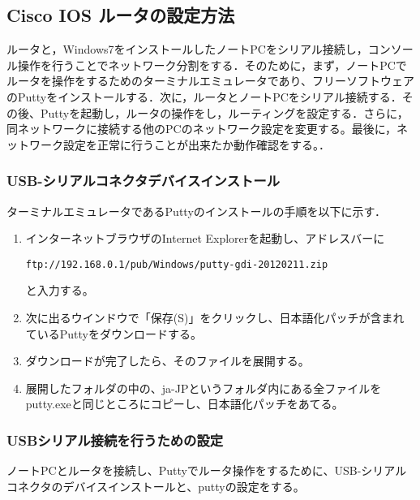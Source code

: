 \documentclass[a4j,titlepage]{jarticle}
\begin{document}
\subsection{Cisco IOS ルータの設定方法}
ルータと，Windows7をインストールしたノートPCをシリアル接続し，コンソール操作を行うことでネットワーク分割をする．そのために，まず，ノートPCでルータを操作をするためのターミナルエミュレータであり、フリーソフトウェアのPuttyをインストールする．次に，ルータとノートPCをシリアル接続する．その後、Puttyを起動し，ルータの操作をし，ルーティングを設定する．さらに，同ネットワークに接続する他のPCのネットワーク設定を変更する。最後に，ネットワーク設定を正常に行うことが出来たか動作確認をする。．

\subsubsection{USB-シリアルコネクタデバイスインストール}
ターミナルエミュレータであるPuttyのインストールの手順を以下に示す．

\begin{enumerate}
  
\item インターネットブラウザのInternet Explorerを起動し、アドレスバーに
\begin{screen}
\begin{center}
\begin{verbatim}
ftp://192.168.0.1/pub/Windows/putty-gdi-20120211.zip
\end{verbatim}
\end{center}
\end{screen}
と入力する。

\item 次に出るウインドウで「保存(S)」をクリックし、日本語化パッチが含まれているPuttyをダウンロードする。

\item ダウンロードが完了したら、そのファイルを展開する。

\item 展開したフォルダの中の、ja-JPというフォルダ内にある全ファイルをputty.exeと同じところにコピーし、日本語化パッチをあてる。

\end{enumerate}

\subsubsection{USBシリアル接続を行うための設定}
ノートPCとルータを接続し、Puttyでルータ操作をするために、USB-シリアルコネクタのデバイスインストールと、puttyの設定をする。
\end{document}
